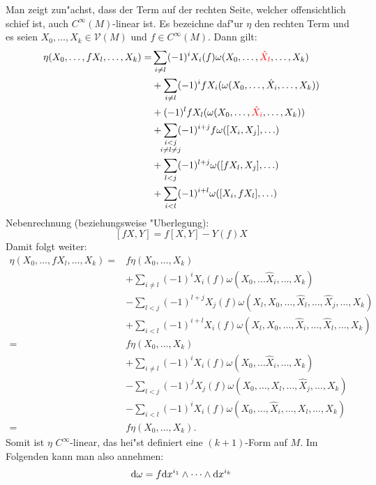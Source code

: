 \begin{bew}
Man zeigt zun"achst, dass der Term auf der rechten Seite, welcher offensichtlich schief ist, auch $C^{\infty}(M)$-linear ist.
Es bezeichne daf"ur $\eta$ den rechten Term und es seien $X_0, \ldots, X_k \in \mathcal V(M)$ und $f \in C^{\infty}(M)$. Dann gilt:
\begin{align*}
    \eta(X_0,\ldots,fX_l,\ldots, X_k) = & \sum_{i \neq l}(-1)^iX_i(f) \omega(X_0,\ldots, \textcolor{red}{\hat X_l}, \ldots, X_k)\\
& + \sum_{i \neq l}(-1)^ifX_i(\omega(X_0,\ldots, \hat X_i, \ldots, X_k))\\
& + (-1)^lfX_l(\omega(X_0, \ldots, \textcolor{red}{\hat X_i}, \ldots, X_k))\\ %
& + \sum_{\mathclap{\substack{i < j \\ i\ne l \ne j }}}(-1)^{i+j}f\omega([X_i,X_j], \ldots )\\ %
& + \sum_{l < j}(-1)^{l+j}\omega([fX_l,X_j], \ldots )\\
& + \sum_{i<l}(-1)^{i+l}\omega([X_i,fX_l], \ldots )
  \end{align*}
Nebenrechnung (beziehungsweise "Uberlegung):
	\[ [fX, Y] = f[X,Y] - Y(f)X \]
Damit folgt weiter:
\begin{align*}
  \eta(X_0,\ldots,fX_l,\ldots, X_k) = & f \eta(X_0,\ldots, X_k) \\
& + \sum_{i\neq l} (-1)^i X_i(f)\omega(X_0, \ldots \hat X_i, \ldots, X_k)\\
& - \sum_{l<j}(-1)^{l+j}X_j(f) \omega(X_l, X_0, \ldots, \hat X_l, \ldots, \hat X_j, \ldots, X_k)\\
& + \sum_{i<l}(-1)^{i+l}X_i(f) \omega(X_l, X_0, \ldots, \hat X_i, \ldots, \hat X_l, \ldots, X_k)\\
= & f \eta(X_0,\ldots, X_k) \\
& + \sum_{i\neq l} (-1)^i X_i(f)\omega(X_0, \ldots \hat X_i, \ldots, X_k)\\
& - \sum_{l<j}(-1)^{j}X_j(f) \omega(X_0, \ldots, X_l, \ldots, \hat X_j, \ldots, X_k)\\
& - \sum_{i<l}(-1)^{i}X_i(f) \omega(X_0, \ldots, \hat X_i, \ldots, X_l, \ldots, X_k)\\
= & f \eta(X_0,\ldots, X_k).
\end{align*}
Somit ist $\eta$ $C^{\infty}$-linear, das hei"st definiert eine $(k+1)$-Form auf $M$.
Im Folgenden kann man also annehmen:
\begin{align*}
  & \dop \omega = f \dop x^{i_1} \wedge \cdots \wedge \dop x^{i_k}\\

\end{align*}
\end{bew}
